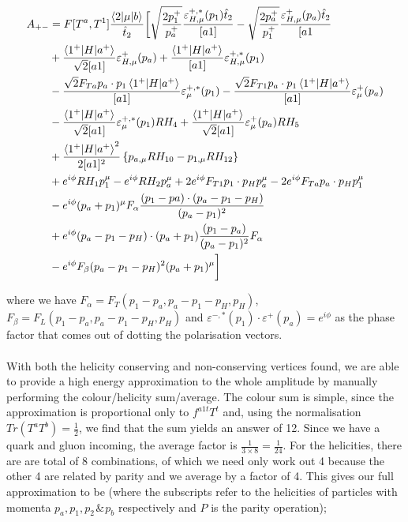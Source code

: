 \begin{equation}
\begin{split}
A_{+-} &=F[T^a,T^1]\frac{\mathinner{\langle2\vert\mu\vert b\rangle}_{}}{\hat{t}_2} \bigg[\sqrt{\frac{2p_1^+}{p_a^+}}\frac{\varepsilon_{H,\mu}^{+,*}(p_1) \hat{t}_2}{[a1]} - \sqrt{\frac{2p_a^+}{p_1^+}}\frac{\varepsilon_{H,\mu}^{+}(p_a)\hat{t}_2}{[a1} \\
&+ \frac{\mathinner{\langle1^+\vert H\vert a^+\rangle}_{}}{\sqrt{2}[a1]}\varepsilon_{H,\mu}^+(p_a) + \frac{\mathinner{\langle1^+\vert H\vert a^+\rangle}_{}}{[a 1]}\varepsilon^{+,*}_{H,\mu}(p_1) \\
&- \frac{\sqrt{2} F_{Ta} p_a \cdot p_1 \mathinner{\langle1^+\vert H\vert a^+\rangle}_{}}{[a1]}\varepsilon^{+,*}_\mu (p_1) - \frac{\sqrt{2} F_{T1} p_a \cdot p_1 \mathinner{\langle1^+\vert H\vert a^+\rangle}_{}}{[a1]}\varepsilon^+_\mu (p_a)  \\ 
& -\frac{\mathinner{\langle1^+\vert H\vert a^+\rangle}_{}}{\sqrt{2} [a1]} \varepsilon^{+,*}_\mu(p_1) R H_4 + \frac{\mathinner{\langle1^+\vert H\vert a^+\rangle}_{}}{\sqrt{2} [a1]} \varepsilon^{+}_\mu(p_a)R H_5 \\
 &+ \frac{\mathinner{\langle1^+\vert H\vert a^+\rangle}_{}^2}{2 [a 1]^2}\left \{ p_{a,\mu} R H_{10} - p_{1,\mu}RH_{12}\right \} \\
 &+ e^{i \phi} R H_1 p_1^\mu - e^{i \phi} R H_2 p_a^\mu + 2 e^{i \phi} F_{T1} p_1\cdot p_H p_a^\mu - 2 e^{i \phi}F_{Ta} p_a \cdot p_H p_1^\mu \\
 &- e^{i \phi} (p_a + p_1)^\mu F_{\alpha} \frac{(p_1-pa)\cdot(p_a-p_1-p_H)}{(p_a-p_1)^2} \\
 &+ e^{i \phi} (p_a - p_1 - p_H) \cdot (p_a + p_1) \frac{(p_1-p_a)}{(p_a-p_1)^2} F_\alpha \\
 &- e^{i \phi} F_\beta (p_a-p_1-p_H)^2 (p_a + p_1)^\mu 
  \bigg]
\end{split}
\end{equation}

where we have $F_\alpha = F_T(p_1-p_a,p_a-p_1-p_H,p_H)$, $F_\beta = F_L(p_1-p_a,p_a-p_1-p_H,p_H)$ and $\varepsilon^{-,*}(p_1) \cdot \varepsilon^+(p_a) = e^{i \phi}$ as the phase factor that comes out of dotting the polarisation vectors. \\
\\
With both the helicity conserving and non-conserving vertices found, we are able to provide a high energy approximation to the whole amplitude by manually performing the colour/helicity sum/average. The colour sum is simple, since the approximation is proportional only to $f^{a1t} T^t$ and, using the normalisation $Tr(T^a T^b) = \frac{1}{2}$, we find that the sum yields an answer of 12. Since we have a quark and gluon incoming, the average factor is $\frac{1}{3 \times 8} = \frac{1}{24}$. For the helicities, there are are total of 8 combinations, of which we need only work out 4 because the other 4 are related by parity and we average by a factor of 4.  This gives our full approximation to be (where the subscripts refer to the helicities of particles with momenta $p_a,p_1,p_2 \hspace{1pt} \& \hspace{1pt} p_b$ respectively and $P$ is the parity operation);

